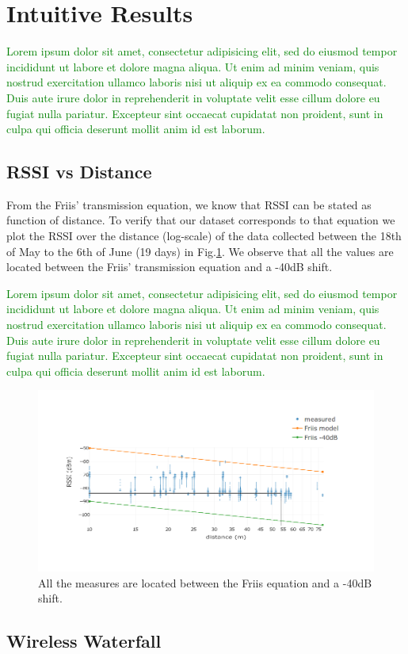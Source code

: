\documentclass{sig-alternate}
\newcommand{\lorem}          {\textcolor{green}{Lorem ipsum dolor sit amet, consectetur adipisicing elit, sed do eiusmod tempor incididunt ut labore et dolore magna aliqua. Ut enim ad minim veniam, quis nostrud exercitation ullamco laboris nisi ut aliquip ex ea commodo consequat. Duis aute irure dolor in reprehenderit in voluptate velit esse cillum dolore eu fugiat nulla pariatur. Excepteur sint occaecat cupidatat non proident, sunt in culpa qui officia deserunt mollit anim id est laborum.}}
\begin{document}
\section{Intuitive Results}
\label{sec:intuitive}

\lorem

\subsection{RSSI vs Distance}
\label{sec:rssi_distance}

From the Friis' transmission equation, we know that RSSI can be stated as function of distance.
To verify that our dataset corresponds to that equation we plot the RSSI over the distance (log-scale) of the data collected between the 18th of May to the 6th of June (19 days) in Fig.\ref{fig:pister_hack}.
We observe that all the values are located between the Friis' transmission equation and a -40dB shift.

\lorem

\begin{figure}
    \centering
    \includegraphics[width=\columnwidth]{pister_hack}
    \caption{All the measures are located between the Friis equation and a -40dB shift.}
    \label{fig:pister_hack}
\end{figure}

\subsection{Wireless Waterfall}

\end{document}
